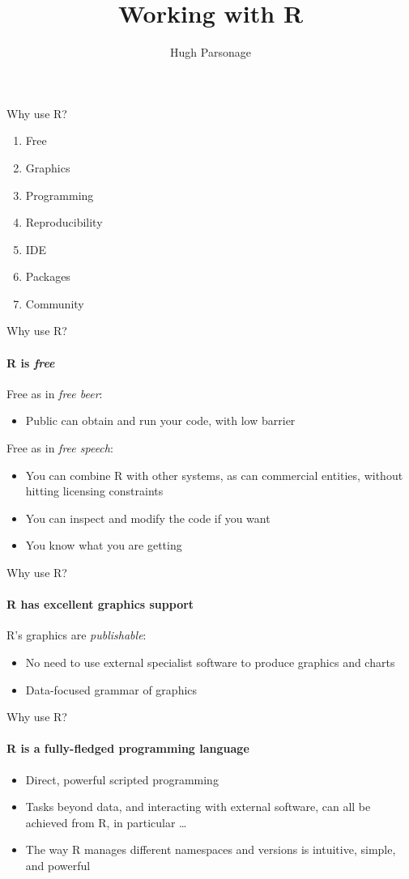 \documentclass{grattan_pres}\usepackage[]{graphicx}\usepackage[]{color}
\title{Working with R}
\author{Hugh Parsonage}
\begin{document}
\begin{frame}{Why use R?}
\begin{enumerate}
\item Free
\item Graphics
\item Programming
\item Reproducibility
\item IDE
\item Packages
\item Community
\end{enumerate}

\end{frame}

\begin{frame}{Why use R?}
\framesubtitle{R is \emph{free}}

Free as in \emph{free beer}:
\begin{itemize}
\item Public can obtain and run your code, with low barrier
\end{itemize}

Free as in \emph{free speech}:
\begin{itemize}
\item You can combine R with other systems, as can commercial entities, without hitting licensing constraints
\item You can inspect and modify the code if you want
\item You know what you are getting
\end{itemize}
\end{frame}

\begin{frame}{Why use R?}
\framesubtitle{R has excellent graphics support}

R's graphics are \emph{publishable}:
\begin{itemize}
\item No need to use external specialist software to produce graphics and charts
\item Data-focused grammar of graphics
\end{itemize}
\end{frame}

\begin{frame}{Why use R?}
\framesubtitle{R is a fully-fledged programming language}

\begin{itemize}
\item Direct, powerful scripted programming 
\item Tasks beyond data, and interacting with external software, can all be achieved from R, in particular \dots{}
\item The way R manages different namespaces and versions is intuitive, simple, and powerful
\end{itemize}
\end{frame}
\end{document}
